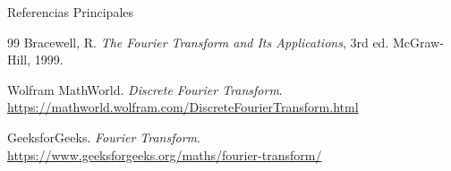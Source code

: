 \documentclass[aspectratio=169]{beamer}
\newcommand{\frt}[1]{\tilde{\text{f}}\left\{#1\right\}}
\begin{document}





\begin{frame}{Referencias Principales}
\begin{thebibliography}{99}
Bracewell, R. \textit{The Fourier Transform and Its Applications}, 3rd ed. McGraw-Hill, 1999.

Wolfram MathWorld. \textit{Discrete Fourier Transform}. 
\url{https://mathworld.wolfram.com/DiscreteFourierTransform.html}

GeeksforGeeks. \textit{Fourier Transform}. 
\url{https://www.geeksforgeeks.org/maths/fourier-transform/}
\end{thebibliography}
\end{frame}
\end{document}
